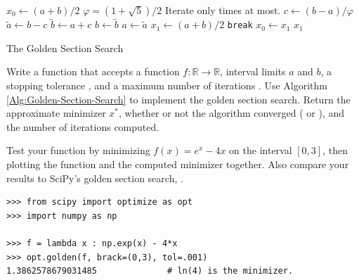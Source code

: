 \begin{algorithm}[H]
\begin{algorithmic}[1]
   \State $x_0 \gets (a + b)/2$
   \State $\varphi = (1+\sqrt{5})/2$
        \Comment Iterate only  times at most.
        \State $c \gets (b - a)/\varphi$
        \State $\tilde{a} \gets b - c$
        \State $\tilde{b} \gets a + c$
            \State $b \gets \tilde{b}$
         \Else{}
            \State $a \gets \tilde{a}$
                \EndIf
        \State $x_1 \gets (a + b)/2$
              \State \texttt{break}
       \EndIf
        \State $x_0 \gets x_1$
   \EndFor
   \State {} $x_1$
\EndProcedure
\end{algorithmic}
\caption{The Golden Section Search}
\label{Alg:Golden-Section-Search}
\end{algorithm}

\begin{problem} %
Write a function that accepts a function $f:\mathbb{R}\rightarrow\mathbb{R}$, interval limits $a$ and $b$, a stopping tolerance , and a maximum number of iterations .
Use Algorithm \ref{Alg:Golden-Section-Search} to implement the golden section search.
Return the approximate minimizer $x^*$, whether or not the algorithm converged ( or ), and the number of iterations computed.

Test your function by minimizing $f(x) = e^x - 4x$ on the interval $[0, 3]$, then plotting the function and the computed minimizer together.
Also compare your results to SciPy's golden section search, .

\begin{lstlisting}
>>> from scipy import optimize as opt
>>> import numpy as np

>>> f = lambda x : np.exp(x) - 4*x
>>> opt.golden(f, brack=(0,3), tol=.001)
1.3862578679031485              # ln(4) is the minimizer.
\end{lstlisting}
\label{prob:golden-section-search}
\end{problem}


